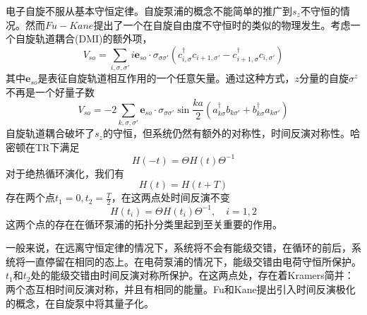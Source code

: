 \documentclass{article}
\numberwithin{equation}{subsection}
\begin{document}
电子自旋不服从基本守恒定律。自旋泵浦的概念不能简单的推广到$s_z$不守恒的情况。然而$Fu-Kane$提出了一个在自旋自由度不守恒时的类似的物理发生。考虑一个自旋轨道耦合(DMI)的额外项，
\begin{equation}
    V_{so}=\sum_{i,\sigma,\sigma'}i\mathbf{e}_{so}\cdot\sigma_{\sigma\sigma'}\left(c_{i,\sigma}^\dagger c_{i+1,\sigma'}-c_{i+1,\sigma}^\dagger c_{i,\sigma'}\right)
\end{equation}
其中$\mathbf{e}_{so}$是表征自旋轨道相互作用的一个任意矢量。通过这种方式，$z$分量的自旋$\sigma^z$不再是一个好量子数
\begin{equation}
    V_{so}=-2\sum_{k,\sigma,\sigma'}\mathbf{e}_{so}\cdot\sigma_{\sigma\sigma'}\sin\frac{ka}{2}(a_{k\sigma}^\dagger b_{k\sigma'}+b_{k\sigma}^\dagger a_{k\sigma'})
\end{equation}
自旋轨道耦合破坏了$s_z$的守恒，但系统仍然有额外的对称性，时间反演对称性。哈密顿在TR下满足
\begin{equation}
    H(-t)=\Theta H(t)\Theta^{-1}
\end{equation}
对于绝热循环演化，我们有
\begin{equation}
    H(t)=H(t+T)
\end{equation}
存在两个点$t_1=0,t_2=\frac{T}{2}$，在这两点处时间反演不变
\begin{equation}
    H(t_i)=\Theta H(t_i)\Theta^{-1},\quad i=1,2
\end{equation}
这两个点的存在在循环泵浦的拓扑分类里起到至关重要的作用。

一般来说，在远离守恒定律的情况下，系统将不会有能级交错，在循环的前后，系统将一直停留在相同的态上。在电荷泵浦的情况下，能级交错由电荷守恒所保护。$t_1$和$t_2$处的能级交错由时间反演对称所保护。在这两点处，存在着Kramers简并：两个态互相时间反演对称，并且有相同的能量。Fu和Kane提出引入时间反演极化的概念，在自旋泵中将其量子化。
\end{document}
